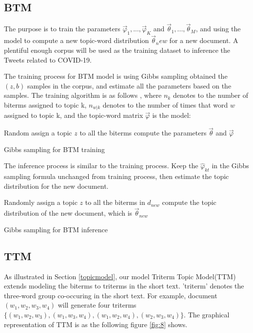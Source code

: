 \subsection{BTM}
The purpose is to train the parameters $\vec\varphi_1,...,\vec\varphi_K$ and $\vec\theta_1,...,\vec\theta_M$, and using the model to compute a new topic-word distribution $\vec\theta_new$ for a new document. A plentiful enough corpus will be used as the training dataset to inference the Tweets related to COVID-19. 

The training process for BTM model is using Gibbs sampling obtained the $(z,b)$ samples in the corpus, and estimate all the parameters based on the samples. The training algorithm is as follows \cite{cheng2014btm}, where $n_k$ denotes to the number of biterms assigned to topic k, $n_{w|k}$ denotes to the number of times that word $w$ assigned to topic k, and the topic-word matrix $\vec\varphi$ is the model:

\begin{algorithm}[H]
  \SetAlgoLined
  \KwOut{$\vec\theta$, $\vec\varphi$}
  Random assign a topic $z$ to all the biterms\;
  compute the parameters $\vec\theta$ and $\vec\varphi$\;
  \caption{Gibbs sampling for BTM training}
\end{algorithm}

The inference process is similar to the training process. Keep the $\hat\varphi_{kt}$ in the Gibbs sampling formula unchanged from training process, then estimate the topic distribution for the new document. 

\begin{algorithm}[H]
  \SetAlgoLined
  Randomly assign a topic $z$ to all the biterms in $d_{new}$\;
  compute the topic distribution of the new document, which is $\vec\theta_{new}$\;
  \caption{Gibbs sampling for BTM inference}
\end{algorithm}

\subsection{TTM}
As illustrated in Section \ref{topicmodel}, our model Triterm Topic Model(TTM) extends modeling the biterms to triterms in the short text. 'triterm' denotes the three-word group co-occuring in the short text. For example, document$(w_1,w_2,w_3,w_4)$ will generate four triterms$\{(w_1,w_2,w_3),(w_1,w_3,w_4),(w_1,w_2,w_4),(w_2,w_3,w_4)\}$. The graphical representation of TTM is as the following figure \ref{fig:8} shows.

